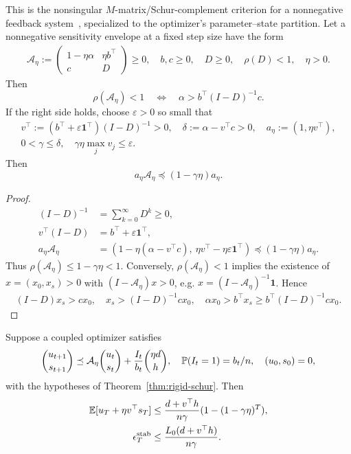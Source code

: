 \begin{theorem}\label{thm:rigid-schur}
This is the nonsingular $M$-matrix/Schur-complement criterion for a nonnegative
feedback system~\citep{berman1994nonnegative}, specialized to the optimizer's
parameter--state partition.
Let a nonnegative sensitivity envelope at a fixed step size have the form
\begin{gather}
 \mathcal A_\eta:=
 \begin{pmatrix}1-\eta\alpha&\eta b^\top\\c&D\end{pmatrix}\ge0,\quad
 b,c\ge0,\quad D\ge0,\quad\rho(D)<1,\quad\eta>0.
\end{gather}
Then
\begin{equation}
 \rho(\mathcal A_\eta)<1\quad\Longleftrightarrow\quad
                      \alpha>b^\top(I-D)^{-1}c.
\end{equation}
If the right side holds, choose $\varepsilon>0$ so small that
\begin{gather}
 v^\top:=(b^\top+\varepsilon\mathbf1^\top)(I-D)^{-1}>0,\quad
 \delta:=\alpha-v^\top c>0,\quad a_\eta:=(1,\eta v^\top),\\
 0<\gamma\le\delta,\quad
 \gamma\eta\max_jv_j\le\varepsilon.
\end{gather}
Then
\begin{equation}
 a_\eta\mathcal A_\eta\preceq(1-\gamma\eta)a_\eta.
\end{equation}
\end{theorem}
\begin{proof}
\begin{align}
 (I-D)^{-1}&=\sum_{k=0}^\infty D^k\ge0,\\
 v^\top(I-D)&=b^\top+\varepsilon\mathbf1^\top,\\
 a_\eta\mathcal A_\eta
 &=(1-\eta(\alpha-v^\top c),\ \eta v^\top-\eta\varepsilon\mathbf1^\top)
 \preceq(1-\gamma\eta)a_\eta.
\end{align}
Thus $\rho(\mathcal A_\eta)\le1-\gamma\eta<1$. Conversely,
$\rho(\mathcal A_\eta)<1$ implies the existence of $x=(x_0,x_s)>0$ with
$(I-\mathcal A_\eta)x>0$, e.g.
$x=(I-\mathcal A_\eta)^{-1}\mathbf1$. Hence
\begin{gather}
 (I-D)x_s>cx_0,\quad x_s>(I-D)^{-1}cx_0,\quad
 \alpha x_0>b^\top x_s\ge b^\top(I-D)^{-1}cx_0.
\end{gather}
\end{proof}
\begin{corollary}\label{cor:rigid-schur-stability}
Suppose a coupled optimizer satisfies
\begin{gather}
 \binom{u_{t+1}}{s_{t+1}}\preceq
 \mathcal A_\eta\binom{u_t}{s_t}
 +\frac{I_t}{b_t}\binom{\eta d}{h},\quad
 \mathbb P(I_t=1)=b_t/n,\quad (u_0,s_0)=0,
\end{gather}
with the hypotheses of Theorem~\ref{thm:rigid-schur}. Then
\begin{align}
 \mathbb E[u_T+\eta v^\top s_T]
 &\le\frac{d+v^\top h}{n\gamma}
                         (1-(1-\gamma\eta)^T),\\
 \epsilon_T^{\mathrm{stab}}&\le\frac{L_0(d+v^\top h)}{n\gamma}.
\end{align}
\end{corollary}
